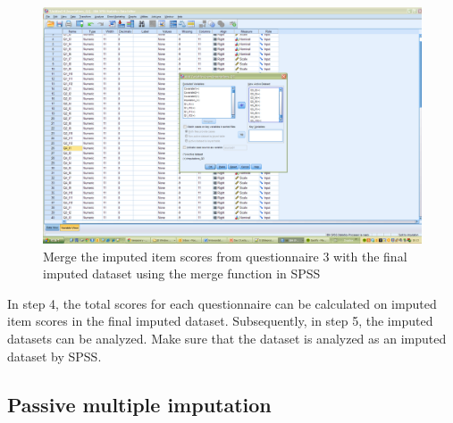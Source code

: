 \documentclass[
]{book}
\begin{document}
\begin{figure}

{\centering \includegraphics[width=0.9\linewidth]{images/fig8.9} 

}

\caption{Merge the imputed item scores from questionnaire 3 with the final imputed dataset using the merge function in SPSS}\label{fig:fig8-9}
\end{figure}

In step 4, the total scores for each questionnaire can be calculated on imputed item scores in the final imputed dataset. Subsequently, in step 5, the imputed datasets can be analyzed. Make sure that the dataset is analyzed as an imputed dataset by SPSS.

\hypertarget{passive-multiple-imputation}{%
\subsection{Passive multiple imputation}\label{passive-multiple-imputation}}
\end{document}
